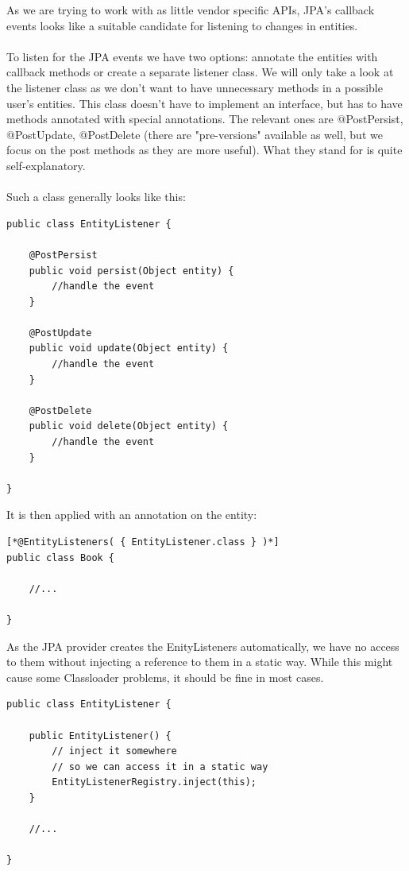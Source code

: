 As we are trying to work with as little vendor specific APIs, JPA's callback events looks like a suitable candidate for listening to changes in entities.
\\\\
To listen for the JPA events we have two options: annotate the entities with callback methods or create a separate listener class. We will only take a look at the listener class as we don't want to have unnecessary methods in a possible user's entities. This class doesn't have to implement an interface, but has to have methods annotated with special annotations. The relevant ones are @PostPersist, @PostUpdate, @PostDelete (there are "pre-versions" available as well, but we focus on the post methods as they are more useful). What they stand for is quite self-explanatory.
\\\\
Such a class generally looks like this:
\\
\lstset{language=java}
\begin{lstlisting}[frame=htrbl, caption={Example JPA entity listener}, label={lst:jpa_entity_listener.java}]
public class EntityListener {

	@PostPersist
	public void persist(Object entity) {
		//handle the event
	}
	
	@PostUpdate
	public void update(Object entity) {
		//handle the event
	}
	
	@PostDelete
	public void delete(Object entity) {
		//handle the event
	}

}
\end{lstlisting}
\noindent
It is then applied with an annotation on the entity:
\\
\lstset{language=java}
\begin{lstlisting}[frame=htrbl, caption={Using a JPA entity listener}, label={lst:using_jpa_entitylisteners.java}]
[*@EntityListeners( { EntityListener.class } )*]
public class Book {

	//...

}
\end{lstlisting}
\noindent
As the JPA provider creates the EnityListeners automatically, we have no access to them without injecting a reference to them in a static way. While this might cause some Classloader problems, it should be fine in most cases.
\\
\lstset{language=java}
\begin{lstlisting}[frame=htrbl, caption={Injecting the EntityListener}, label={lst:jpa_entity_listener.java}]
public class EntityListener {

	public EntityListener() {
		// inject it somewhere
		// so we can access it in a static way
		EntityListenerRegistry.inject(this);
	}

	//...

}
\end{lstlisting}

